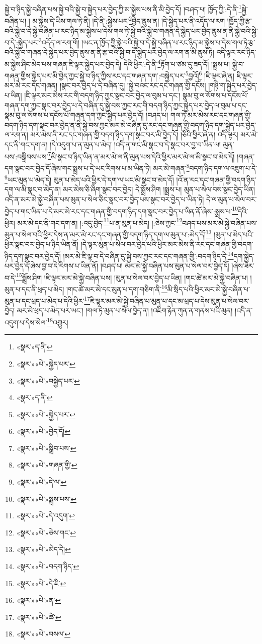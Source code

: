 སྐྱེ་བ་ཉིད་སྐྱེ་བཞིན་པས་སྐྱེ་བའི་སྐྱེ་བ་སྐྱེད་པར་བྱེད་ཀྱི་མ་སྐྱེས་པས་ནི་མི་བྱེད་དོ། །བཤད་པ། ཁྱོད་ཀྱི་:དེ་ནི་\footnote{«སྣར་»ད་ནི་}སྐྱེ་བཞིན་པ། །
མ་སྐྱེས་དེ་ཡིས་གལ་ཏེ་ནི། །དེ་ནི་:སྐྱེས་པར་\footnote{«སྣར་»«པེ་»སྐྱེད་པར་}བྱེད་ནུས་ན། །དེ་སྐྱེད་པར་ནི་འདོད་ལ་རག །ཁྱོད་ཀྱི་རྩ་བའི་སྐྱེ་བ་དེ་སྐྱེ་བཞིན་པ་རང་ཉིད་མ་སྐྱེས་པ་དེས་གལ་ཏེ་སྐྱེ་བའི་སྐྱེ་བ་གཞན་དེ་སྐྱེད་པར་བྱེད་ནུས་ན་ནི་སྐྱེ་བའི་སྐྱེ་བ་དེ་:སྐྱེད་པར་\footnote{«སྣར་»«པེ་»བསྐྱེད་པར་}འདོད་ལ་རག་གོ། །ཡང་ན་ཁྱོད་ཀྱི་སྐྱེ་བའི་སྐྱེ་བ་དེ་སྐྱེ་བཞིན་པ་རང་ཉིད་མ་སྐྱེས་པ་དེས་གལ་ཏེ་རྩ་བའི་སྐྱེ་བ་གཞན་དེ་སྐྱེད་པར་བྱེད་ནུས་ན་ནི་རྩ་བའི་སྐྱེ་བ་དེ་སྐྱེད་པར་བྱེད་ལ་རག་ན་མི་ནུས་ཏེ། འདི་ལྟར་རང་ཉིད་མ་སྐྱེས་ཤིང་མེད་པས་གཞན་ཇི་ལྟར་སྐྱེད་པར་བྱེད་དེ། དེའི་ཕྱིར་:དེ་ནི་\footnote{«སྣར་»ད་ནི་}རྟོག་པ་ཙམ་དུ་ཟད་དོ། །སྨྲས་པ། སྐྱེ་བ་གཞན་གྱིས་སྐྱེད་པར་མི་བྱེད་ཀྱང་སྐྱེ་བ་ཉིད་ཀྱིས་རང་དང་གཞན་དག་:བསྐྱེད་པར་\footnote{«སྣར་»«པེ་»སྐྱེད་པར་}བྱའོ།\footnote{«སྣར་»«པེ་»བྱེད་དོ།} །ཇི་ལྟར་ཞེ་ན། ཇི་ལྟར་མར་མེ་རང་དང་གཞན། །སྣང་བར་བྱེད་པ་དེ་བཞིན་དུ། །སྐྱེ་བའང་རང་དང་གཞན་གྱི་དངོས། །གཉི་ག་སྐྱེད་པར་བྱེད་པ་ཡིན། །ཇི་ལྟར་མར་མེས་རང་གི་བདག་ཉིད་ཀྱང་སྣང་བར་བྱེད་ལ་བུམ་པ་དང་། སྣམ་བུ་ལ་སོགས་པ་དངོས་པོ་གཞན་དག་ཀྱང་སྣང་བར་བྱེད་པ་དེ་བཞིན་དུ་སྐྱེ་བས་ཀྱང་རང་གི་བདག་ཉིད་ཀྱང་སྐྱེད་པར་བྱེད་ལ་བུམ་པ་དང་སྣམ་བུ་ལ་སོགས་པ་དངོས་པོ་གཞན་དག་ཀྱང་སྐྱེད་པར་བྱེད་དོ། །བཤད་པ། གལ་ཏེ་མར་མེས་རང་དང་གཞན་གྱི་བདག་ཉིད་དག་སྣང་བར་བྱེད་ན་ནི་སྐྱེ་བས་ཀྱང་མར་མེ་བཞིན་དུ་རང་དང་གཞན་གྱི་བདག་ཉིད་དག་སྐྱེད་པར་བྱེད་ལ་རག་ན། མར་མེས་ནི་རང་དང་གཞན་གྱི་བདག་ཉིད་དག་སྣང་བར་མི་བྱེད་དོ། །ཅིའི་ཕྱིར་ཞེ་ན། འདི་ལྟར། མར་མེ་དང་ནི་གང་དག་ན། །དེ་འདུག་པ་ན་མུན་པ་མེད། །འདི་ན་གང་མི་སྣང་བ་དེ་སྣང་བར་བྱ་བ་ཡིན་ལ། མུན་པས་:བསྒྲིབས་པས་\footnote{«སྣར་»«པེ་»སྒྲིབ་པས་}མི་སྣང་བ་ཉིད་ཡིན་ན་མར་མེ་ལ་ནི་མུན་པས་དེའི་ཕྱིར་མར་མེ་ལ་མི་སྣང་བ་མེད་དོ། །གཞན་དག་སྣང་བར་བྱེད་དོ་ཞེས་གང་སྨྲས་པ་དེ་ཡང་རིགས་པ་མ་ཡིན་ཏེ། མར་མེ་གཞན་\footnote{«སྣར་»«པེ་»གཞན་གྱི་}བདག་ཉིད་དག་ལ་འཇུག་པ་དེ་\footnote{«སྣར་»«པེ་»དེ་ལ་}ཡང་མུན་པ་མེད་དེ། མུན་པ་མེད་པའི་ཕྱིར་དེ་དག་ལ་ཡང་མི་སྣང་བ་མེད་དོ། །འོ་ན་རང་དང་གཞན་གྱི་བདག་ཉིད་དག་ལ་མི་སྣང་བ་མེད་ན། མར་མེས་ཅི་ཞིག་སྣང་བར་བྱེད། དེ་སྨྲོས་ཤིག །སྨྲས་པ། མུན་པ་སེལ་བས་སྣང་བྱེད་ཡིན། འདི་ན་མར་མེ་སྐྱེ་བཞིན་པས་མུན་པ་སེལ་ཅིང་སྣང་བར་བྱེད་པས་སྣང་བར་བྱེད་པ་ཡིན་ཏེ། དེ་ལ་མུན་པ་སེལ་བར་བྱེད་པ་གང་ཡིན་པ་དེ་མར་མེ་རང་དང་གཞན་གྱི་བདག་ཉིད་དག་སྣང་བར་བྱེད་པ་ཡིན་ནོ་ཞེས་:སྨྲས་པ་\footnote{«སྣར་»«པེ་»སྨྲས་པས་}དེའི་ཕྱིར། མར་མེ་དང་ནི་གང་དག་ན། །:འདུ་བྱེད་\footnote{«སྣར་»«པེ་»དེ་འདུག་}པ་ན་མུན་པ་མེད། །:ཅེས་ཀྱང་\footnote{«སྣར་»«པེ་»ཅེས་གང་}བཤད་པས་མར་མེ་སྐྱེ་བཞིན་པས་མུན་པ་སེལ་བའི་ཕྱིར་དེས་ན་མར་མེ་རང་དང་གཞན་གྱི་བདག་ཉིད་དག་ལ་མུན་པ་:མེད་དོ།\footnote{«སྣར་»«པེ་»མེད་དེ།} །མུན་པ་མེད་པའི་ཕྱིར་སྣང་བར་བྱེད་པ་ཉིད་ཡིན་ནོ། །དེ་ལྟར་མུན་པ་སེལ་བར་བྱེད་པའི་ཕྱིར་མར་མེས་ནི་རང་དང་གཞན་གྱི་བདག་ཉིད་དག་སྣང་བར་བྱེད་དོ། །མར་མེ་ཇི་ལྟ་བ་དེ་བཞིན་དུ་སྐྱེ་བས་ཀྱང་རང་དང་གཞན་གྱི་:བདག་ཉིད་དེ་\footnote{«སྣར་»«པེ་»བདག་ཉིད་}དག་སྐྱེད་པར་བྱེད་དོ་ཞེས་བྱ་བ་དེ་རིགས་པ་ཡིན་ནོ། །བཤད་པ། མར་མེ་སྐྱེ་བཞིན་པས་མུན་པ་སེལ་བར་བྱེད་དོ། །ཞེས་ཟེར་བ་དེ་\footnote{«སྣར་»«པེ་»དེ་ཇི་}སྨྲོས་ཤིག །ཇི་ལྟར་མར་མེ་སྐྱེ་བཞིན་པས། །མུན་པ་སེལ་བར་བྱེད་པ་ཡིན། །གང་ཚེ་མར་མེ་སྐྱེ་བཞིན་པ། །མུན་པ་དང་ནི་ཕྲད་པ་མེད། །གང་ཚེ་མར་མེ་དང་མུན་པ་དག་གཅིག་ནི་\footnote{«སྣར་»«པེ་»ན་}མི་སྲིད་པའི་ཕྱིར་མར་མེ་སྐྱེ་བཞིན་པ་མུན་པ་དང་ཕྲད་པ་མེད་པ་དེའི་ཕྱིར་\footnote{«སྣར་»«པེ་»ཚེ་}ཇི་ལྟར་མར་མེ་སྐྱེ་བཞིན་པ་མུན་པ་དང་མ་ཕྲད་པ་དེས་མུན་པ་སེལ་བར་བྱེད། མར་མེ་ཕྲད་པ་མེད་པར་ཡང་། །གལ་ཏེ་མུན་པ་སེལ་བྱེད་ན། །འཇིག་རྟེན་ཀུན་ན་གནས་པའི་མུན། །འདི་ན་འདུག་པ་དེས་སེལ་\footnote{«སྣར་»«པེ་»བསལ་}འགྱུར། 